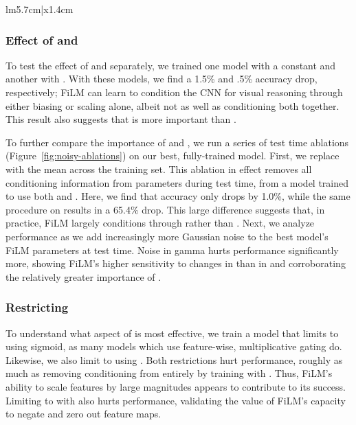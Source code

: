 \documentclass[letterpaper]{article} \usepackage{aaai18}  \usepackage{times}  \usepackage{helvet}  \usepackage{courier}  \usepackage{url}  \usepackage{graphicx}  \frenchspacing  \setlength{\pdfpagewidth}{8.5in}  \setlength{\pdfpageheight}{11in}
\begin{document}
\begin{table}[ht!]
{\begin{tabular}{lm{5.7cm}|x{1.4cm}}
        \end{tabular}
        }
        \caption{\label{tab:ablations}
        CLEVR val accuracy for ablations, trained with the best architecture with only specified changes. We report the standard deviation of the best model accuracy over 5 runs.}
        \end{table}
        
        \subsubsection{Effect of  and }
        
        To test the effect of  and  separately, we trained one model with a constant  and another with . With these models, we find a 1.5\% and .5\% accuracy drop, respectively; FiLM can learn to condition the CNN for visual reasoning through either biasing or scaling alone, albeit not as well as conditioning both together. This result also suggests that  is more important than .
        
        To further compare the importance of  and , we run a series of test time ablations (Figure~\ref{fig:noisy-ablations}) on our best, fully-trained model. First, we replace  with the mean  across the training set. This ablation in effect removes all conditioning information from  parameters during test time, from a model trained to use both  and . Here, we find that accuracy only drops by 1.0\%, while the same procedure on  results in a 65.4\% drop. This large difference suggests that, in practice, FiLM largely conditions through  rather than . Next, we analyze performance as we add increasingly more Gaussian noise to the best model's FiLM parameters at test time. Noise in gamma hurts performance significantly more, showing FiLM's higher sensitivity to changes in  than in  and corroborating the relatively greater importance of .


        \subsubsection{Restricting }
        To understand what aspect of  is most effective, we train a model that limits  to  using sigmoid, as many models which use feature-wise, multiplicative gating do. Likewise, we also limit  to  using . Both restrictions hurt performance, roughly as much as removing conditioning from  entirely by training with . Thus, FiLM's ability to scale features by large magnitudes appears to contribute to its success. Limiting  to  with  also hurts performance, validating the value of FiLM's capacity to negate and zero out feature maps.
        
\end{document}
